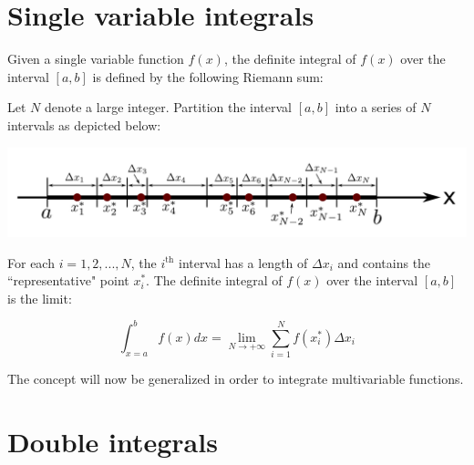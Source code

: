 \documentclass{article}
\begin{document}
\section*{Single variable integrals}

Given a single variable function \(f(x)\), the definite integral of \(f(x)\) over the interval \([a, b]\) is defined by the following Riemann sum:

Let \(N\) denote a large integer. Partition the interval \([a, b]\) into a series of \(N\) intervals as depicted below:

\includegraphics[width = \textwidth]{single_integral_riemann_sum}

For each \(i = 1, 2, ..., N\), the \(i^{\text{th}}\) interval has a length of \(\Delta x_i\) and contains the ``representative" point \(x_i^*\). The definite integral of \(f(x)\) over the interval \([a, b]\) is the limit:

\[\int_{x = a}^b f(x)dx = \lim_{N \rightarrow +\infty} \sum_{i=1}^N f(x_i^*)\Delta x_i\] 

The concept will now be generalized in order to integrate multivariable functions. 



\section*{Double integrals}
\end{document}
